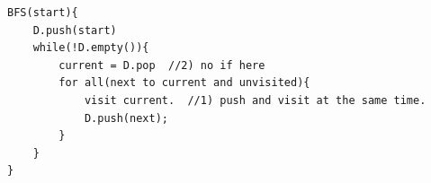 \documentclass[a4paper,11pt,twoside]{book}
\begin{document}
\begin{lstlisting} 
BFS(start){
	D.push(start)  
	while(!D.empty()){
		current = D.pop  //2) no if here
		for all(next to current and unvisited){
			visit current.  //1) push and visit at the same time. 
			D.push(next);
		}
	}
}		
\end{lstlisting}	


%

%	
%	


%
%
%
\end{document}
